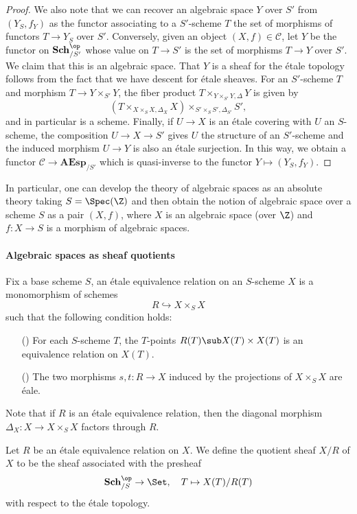 \begin{proof}
We also note that we can recover an algebraic space $Y$ over $S'$ from $(Y_S,f_Y)$ as the functor associating to a $S'$-scheme $T$ the set of morphisms of functors $T\to Y_S$ over $S'$. Conversely, given an object $(X,f)\in\mathcal{C}$, let $Y$ be the functor on $\mathbf{Sch}_{/S'}^{\op}$ whose value on $T\to S'$ is the set of morphisms $T\to Y$ over $S'$. We claim that this is an algebraic space. That $Y$ is a sheaf for the \'etale topology follows from the fact that we have descent for \'etale sheaves. For an $S'$-scheme $T$ and morphism $T\to Y\times_{S'}Y$, the fiber product $T\times_{Y\times_{S'}Y,\Delta}Y$ is given by
\[(T\times_{X\times_SX,\Delta_X}X)\times_{S'\times_SS',\Delta_{S'}}S',\]
and in particular is a scheme. Finally, if $U\to X$ is an \'etale covering with $U$ an $S$-scheme, the composition $U\to X\to S'$ gives $U$ the structure of an $S'$-scheme and the induced morphism $U\to Y$ is also an \'etale surjection. In this way, we obtain a functor $\mathcal{C}\to\mathbf{AEsp}_{/S'}$ which is quasi-inverse to the functor $Y\mapsto (Y_S,f_Y)$.
\end{proof}

In particular, one can develop the theory of algebraic spaces as an absolute theory taking $S=\Spec(\Z)$ and then obtain the notion of algebraic space over a scheme $S$ as a pair $(X,f)$, where $X$ is an algebraic space (over $\Z$) and $f:X\to S$ is a morphism of algebraic spaces.

\paragraph{Algebraic spaces as sheaf quotients}
Fix a base scheme $S$, an \'etale equivalence relation on an $S$-scheme $X$ is a monomorphism of schemes
\[R\hookrightarrow X\times_SX\]
such that the following condition holds:
\begin{enumerate}
    \item[(\rmnum{1})] For each $S$-scheme $T$, the $T$-points $R(T)\sub X(T)\times X(T)$ is an equivalence relation on $X(T)$.
    \item[(\rmnum{2})] The two morphisms $s,t:R\to X$ induced by the projections of $X\times_SX$ are \'eale. 
\end{enumerate}
Note that if $R$ is an \'etale equivalence relation, then the diagonal morphism $\Delta_X:X\to X\times_SX$ factors through $R$.\par

Let $R$ be an \'etale equivalence relation on $X$. We define the quotient sheaf $X/R$ of $X$ to be the sheaf associated with the presheaf
\[\mathbf{Sch}_{/S}^{\op}\to \Set,\quad T\mapsto X(T)/R(T)\]
with respect to the \'etale topology.

